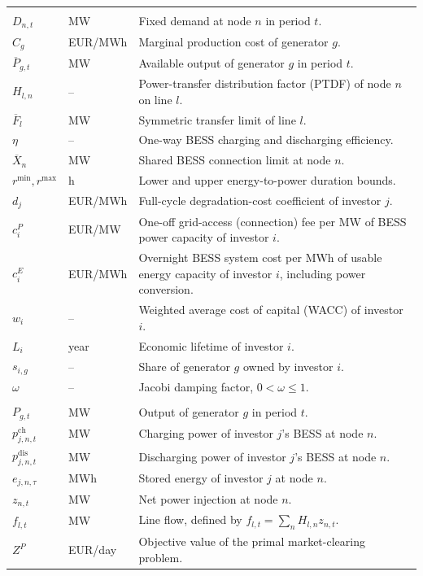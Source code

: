 \documentclass[11pt,a4paper,fleqn]{article}
\numberwithin{equation}{section}
\begin{document}
{\begin{longtable}{@{}>{\RaggedRight\arraybackslash}p{}
                       >{\RaggedRight\arraybackslash}p{}
                       >{\RaggedRight\arraybackslash}p{}@{}}
\addlinespace
\multicolumn{3}{@{}l}{\textit{Parameters}}\\
\addlinespace[0.3ex]
$D_{n,t}$ & MW & Fixed demand at node $n$ in period $t$.\\
$C_g$ & EUR/MWh & Marginal production cost of generator $g$.\\
$\overline P_{g,t}$ & MW & Available output of generator $g$ in period $t$.\\
$H_{l,n}$ & -- & Power-transfer distribution factor (PTDF) of node $n$ on line $l$.\\
$\overline F_l$ & MW & Symmetric transfer limit of line $l$.\\
$\eta$ & -- & One-way BESS charging and discharging efficiency.\\
$\overline X_n$ & MW & Shared BESS connection limit at node $n$.\\
$r^{\min},r^{\max}$ & h & Lower and upper energy-to-power duration bounds.\\
$d_j$ & EUR/MWh & Full-cycle degradation-cost coefficient of investor $j$.\\
$c_i^P$ & EUR/MW & One-off grid-access (connection) fee per MW of BESS power capacity of investor $i$.\\
$c_i^E$ & EUR/MWh & Overnight BESS system cost per MWh of usable energy capacity of investor $i$, including power conversion.\\
$w_i$ & -- & Weighted average cost of capital (WACC) of investor $i$.\\
$L_i$ & year & Economic lifetime of investor $i$.\\
$s_{i,g}$ & -- & Share of generator $g$ owned by investor $i$.\\
$\omega$ & -- & Jacobi damping factor, $0<\omega\leq 1$.\\

\addlinespace
\multicolumn{3}{@{}l}{\textit{Lower-level primal variables ($\Xi^{\mathrm{LL}}$)}}\\
\addlinespace[0.3ex]
$P_{g,t}$ & MW & Output of generator $g$ in period $t$.\\
$p^{\mathrm{ch}}_{j,n,t}$ & MW & Charging power of investor $j$'s BESS at node $n$.\\
$p^{\mathrm{dis}}_{j,n,t}$ & MW & Discharging power of investor $j$'s BESS at node $n$.\\
$e_{j,n,\tau}$ & MWh & Stored energy of investor $j$ at node $n$.\\
$z_{n,t}$ & MW & Net power injection at node $n$.\\
$f_{l,t}$ & MW & Line flow, defined by $f_{l,t}=\sum_n H_{l,n}z_{n,t}$.\\
$Z^P$ & EUR/day & Objective value of the primal market-clearing problem.\\


\end{longtable}}
\end{document}
